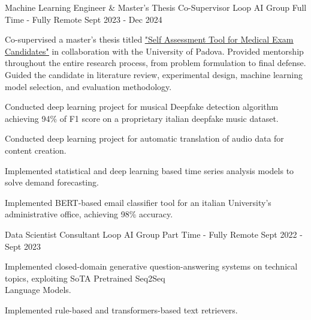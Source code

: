 \begin{cventries}
    
    \cventry
    {Machine Learning Engineer \& Master's Thesis Co-Supervisor} %
    {Loop AI Group} %
    {Full Time - Fully Remote} %
    {Sept 2023 - Dec 2024} %
    {
      \begin{cvitems} %
        \item {
        Co-supervised a master's thesis titled \href{https://thesis.unipd.it/handle/20.500.12608/70905}{\underline{"Self Assessment Tool for Medical Exam Candidates"}} in collaboration with the University of Padova.
Provided mentorship throughout the entire research process, from problem formulation to final defense.
Guided the candidate in literature review, experimental design, machine learning model selection, and evaluation methodology.
        }
        \item {Conducted deep learning project for musical Deepfake detection algorithm achieving 94\% of F1 score on a proprietary italian deepfake music dataset.}
        \item {Conducted deep learning project for automatic translation of audio data for content creation.}
        \item {Implemented statistical and deep learning based time series analysis models to solve demand forecasting.}
        \item {Implemented BERT-based email classifier tool for an italian University's administrative office, achieving 98\% accuracy.}
      \end{cvitems}
    }

    
    \cventry
    {Data Scientist Consultant} %
    {Loop AI Group} %
    {Part Time - Fully Remote} %
    {Sept 2022 - Sept 2023} %
    {
      \begin{cvitems} %
        \item {Implemented closed-domain generative question-answering systems on technical topics, exploiting SoTA Pretrained Seq2Seq \\Language Models.}
        \item {Implemented rule-based and transformers-based text retrievers.}
      \end{cvitems}
    } 
    \begin{comment}
    \cventry
    {Bartender} %
    {Chiosco il Tempio} %
    {Part Time - Florence, Italy} %
    {June 2017 - Sept 2022} %
    {
        \begin{cvitems} %
        \item {Managed inventory and organized events, improving customer engagement and operational efficiency.}
        \item {Led team scheduling and ensured high standards of service and compliance with safety regulations.}
        \item {\textbf{Soft Skills:} Public Relations Management, Communication, Time Management, Multitasking.}
    \end{cvitems}
    }
    \end{comment}


\end{cventries}
